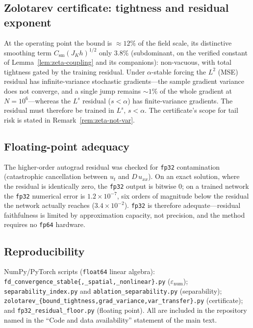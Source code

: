 \documentclass[review,12pt]{elsarticle}
\begin{document}
\subsection{Zolotarev certificate: tightness and residual exponent}
At the operating point the bound is $\approx 12\%$ of the field scale,
its distinctive smoothing term $C_{\mathrm{sm}}(J_K h)^{1/2}$ only
$3.8\%$ (subdominant, on the verified constant of
Lemma~\ref{lem:zeta-coupling} and its companions): non-vacuous, with
total tightness gated by the training residual. Under $\alpha$-stable
forcing the $L^2$ (MSE) residual has infinite-variance stochastic
gradients---the sample gradient variance does not converge, and a single
jump remains $\sim 1\%$ of the whole gradient at $N = 10^6$---whereas the
$L^s$ residual ($s < \alpha$) has finite-variance gradients. The residual
must therefore be trained in $L^s$, $s < \alpha$. The certificate's scope
for tail risk is stated in Remark~\ref{rem:zeta-not-var}.

\subsection{Floating-point adequacy}
The higher-order autograd residual was checked for \texttt{fp32}
contamination (catastrophic cancellation between $u_t$ and $D\,u_{xx}$).
On an exact solution, where the residual is identically zero, the
\texttt{fp32} output is bitwise $0$; on a trained network the
\texttt{fp32} numerical error is $1.2\times10^{-7}$, six orders of
magnitude below the residual the network actually reaches
($3.4\times10^{-2}$). \texttt{fp32} is therefore adequate---residual
faithfulness is limited by approximation capacity, not precision, and
the method requires no \texttt{fp64} hardware.

\subsection{Reproducibility}
NumPy/PyTorch scripts (\texttt{float64} linear algebra):
\texttt{fd\_convergence\_stable\{,\_spatial,\_nonlinear\}.py}
($\varepsilon_{\mathrm{num}}$); \texttt{separability\_index.py} and
\texttt{ablation\_separability.py} (separability);
\texttt{zolotarev\_\{bound\_tightness,grad\_variance,var\_transfer\}.py}
(certificate); and \texttt{fp32\_residual\_floor.py} (floating point).
All are included in the repository named in the ``Code and data
availability'' statement of the main text.



\end{document}
